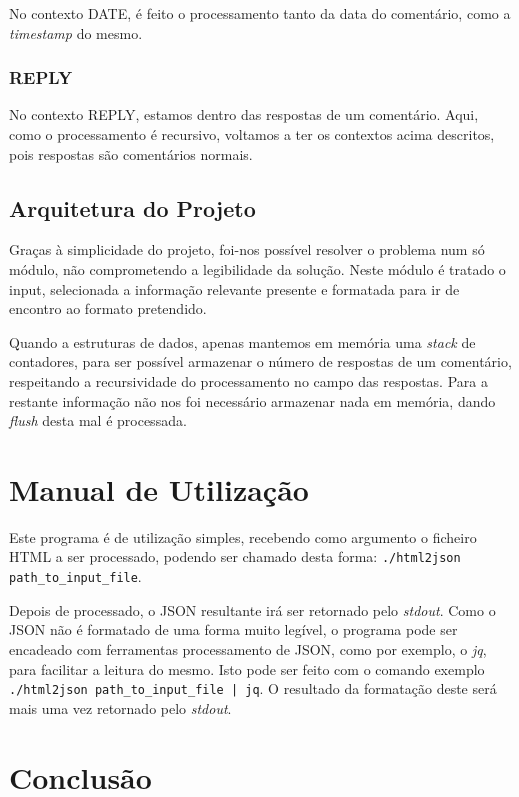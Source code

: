 \documentclass[a4paper]{report}
\begin{document}
No contexto DATE, é feito o processamento tanto da data do comentário, como
a \textit{timestamp} do mesmo.

\subsection{REPLY}

No contexto REPLY, estamos dentro das respostas de um comentário. Aqui,
como o processamento é recursivo, voltamos a ter os contextos acima descritos,
pois respostas são comentários normais.

\section{Arquitetura do Projeto}

Graças à simplicidade do projeto, foi-nos possível resolver o problema num
só módulo, não comprometendo a legibilidade da solução. Neste módulo é tratado
o input, selecionada a informação relevante presente e formatada para ir de
encontro ao formato pretendido.

Quando a estruturas de dados, apenas mantemos em memória uma \textit{stack}
de contadores, para ser possível armazenar o número de respostas de um
comentário, respeitando a recursividade do processamento no campo das respostas.
Para a restante informação não nos foi necessário armazenar nada em memória,
dando \textit{flush} desta mal é processada.

\chapter{Manual de Utilização}

Este programa é de utilização simples, recebendo como argumento o ficheiro
HTML a ser processado, podendo ser chamado desta forma: 
\verb!./html2json path_to_input_file!.

Depois de processado, o JSON resultante irá ser retornado pelo \textit{stdout}.
Como o JSON não é formatado de uma forma muito legível, o programa pode ser
encadeado com ferramentas processamento de JSON, como por exemplo, o \textit{jq},
para facilitar a leitura do mesmo. Isto pode ser feito com o comando exemplo
\verb!./html2json path_to_input_file | jq!. O resultado da formatação deste
será mais uma vez retornado pelo \textit{stdout}.

\chapter{Conclusão}
\end{document}
